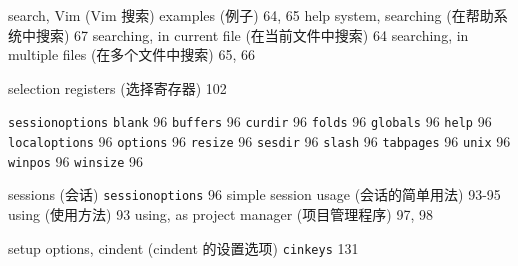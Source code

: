 search, Vim (Vim 搜索)
  examples (例子) 64, 65
  help system, searching (在帮助系统中搜索) 67
  searching, in current file (在当前文件中搜索) 64
  searching, in multiple files (在多个文件中搜索) 65, 66

selection registers (选择寄存器) 102

\texttt{sessionoptions}
  \texttt{blank} 96
  \texttt{buffers} 96
  \texttt{curdir} 96
  \texttt{folds} 96
  \texttt{globals} 96
  \texttt{help} 96
  \texttt{localoptions} 96
  \texttt{options} 96
  \texttt{resize} 96
  \texttt{sesdir} 96
  \texttt{slash} 96
  \texttt{tabpages} 96
  \texttt{unix} 96
  \texttt{winpos} 96
  \texttt{winsize} 96

sessions (会话)
  \texttt{sessionoptions} 96
  simple session usage (会话的简单用法) 93-95
  using (使用方法) 93
  using, as project manager (项目管理程序) 97, 98

setup options, cindent (cindent 的设置选项)
  \texttt{cinkeys} 131
